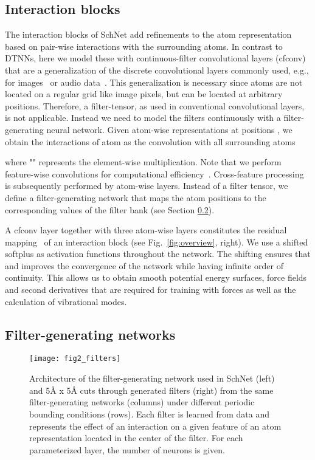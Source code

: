 \documentclass[aip,jcp,reprint,graphicx]{revtex4-1}
\newcommand{\new}[1]{#1}
\begin{document}
\subsection{Interaction blocks}

The interaction blocks of SchNet add refinements to the atom representation based on pair-wise interactions with the surrounding atoms.
In contrast to DTNNs, here we model these with continuous-filter convolutional layers (cfconv) that are a generalization of the discrete convolutional layers commonly used, e.g., for images~\citep{lecun1989backpropagation, krizhevsky2012imagenet} or audio data~\citep{van2016wavenet}.
This generalization is necessary since atoms are not located on a regular grid like image pixels, but can be located at arbitrary positions.
\new{Therefore, a filter-tensor, as used in conventional convolutional layers, is not applicable. Instead we need to model the filters continuously with a filter-generating neural network.}
Given atom-wise representations  at positions , we obtain the interactions of atom  as the convolution with all surrounding atoms

where "" represents the element-wise multiplication. 
Note that we perform feature-wise convolutions for computational efficiency~\citep{chollet2016xception}.
Cross-feature processing is subsequently performed by atom-wise layers.
Instead of a filter tensor, we define a filter-generating network  that maps the atom positions to the corresponding values of the filter bank (see Section \ref{sec:fgn}).

A cfconv layer together with three atom-wise layers constitutes the residual mapping~\citep{he2016deep} of an interaction block (see Fig.~\ref{fig:overview}, right).
We use a shifted softplus  as activation functions throughout the network.
The shifting ensures that  and improves the convergence of the network \new{while having infinite order of continuity.
This allows us to obtain smooth potential energy surfaces, force fields and second derivatives that are required for training with forces as well as the calculation of vibrational modes.}

\subsection{Filter-generating networks}\label{sec:fgn}
\begin{figure}
	\texttt{[image: fig2\_filters]}
	\caption{Architecture of the filter-generating network used in SchNet (left) and 5{\AA} x 5{\AA} cuts through generated filters (right) from the same filter-generating networks (columns) under different periodic bounding conditions (rows). Each filter is learned from data and represents the effect of an interaction on a given feature of an atom representation located in the center of the filter. \new{For each parameterized layer, the number of neurons is given.}}\label{fig:filter}
\end{figure}
\end{document}
